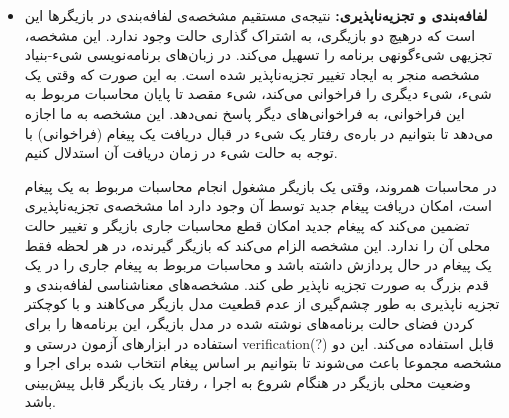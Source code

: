 \begin{itemize}
\item \textbf{لفافه‌بندی و \gls{تجزیه‌ناپذیر}ی:}  
نتیجه‌ی مستقیم مشخصه‌ی لفافه‌بندی در بازیگر‌ها این است که درهیچ دو بازیگری، به اشتراک گذاری حالت وجود ندارد. این مشخصه، \gls{تجزیه}ی \gls{شیءگونه}ی برنامه را تسهیل می‌کند. در زبان‌های برنامه‌نویسی \gls{شیء-بنیاد} مشخصه منجر به ایجاد تغییر تجزیه‌ناپذیر شده است. به این صورت که وقتی یک شیء، شیء دیگری را فراخوانی می‌کند، شیء مقصد تا پایان محاسبات مربوط به این فراخوانی، به فراخوانی‌های دیگر پاسخ نمی‌دهد.  این مشخصه به ما اجازه می‌دهد تا بتوانیم در باره‌ی رفتار یک شیء در قبال دریافت یک پیغام (فراخوانی) با توجه به حالت شیء در زمان دریافت آن \gls{استدلال} کنیم.

در محاسبات همروند، وقتی یک بازیگر مشغول انجام محاسبات مربوط به یک پیغام است، امکان دریافت پیغام جدید توسط آن وجود دارد اما مشخصه‌ی تجزیه‌ناپذیری تضمین می‌کند که پیغام جدید امکان قطع محاسبات جاری بازیگر و تغییر حالت محلی آن را ندارد. این مشخصه الزام می‌کند که بازیگر گیرنده، در هر لحظه فقط یک پیغام در حال پردازش داشته باشد و محاسبات مربوط به  پیغام جاری را در یک قدم بزرگ به صورت تجزیه ناپذیر طی کند. \cite{AghaMST97}
مشخصه‌های معناشناسی لفافه‌بندی و تجزیه ناپذیری به طور  چشم‌گیری از عدم قطعیت مدل بازیگر می‌کاهند و با کوچکتر کردن فضای حالت برنامه‌های نوشته شده در مدل بازیگر، این برنامه‌ها را برای استفاده در ابزارهای آزمون درستی و  verification(?) قابل استفاده می‌کند\cite{LauterburgKMA10}.
این دو مشخصه مجموعا باعث می‌شوند تا بتوانیم بر اساس پیغام انتخاب شده برای اجرا و وضعیت محلی بازیگر در هنگام شروع به اجرا ، رفتار یک بازیگر قابل پیش‌بینی باشد.


\end{itemize}
